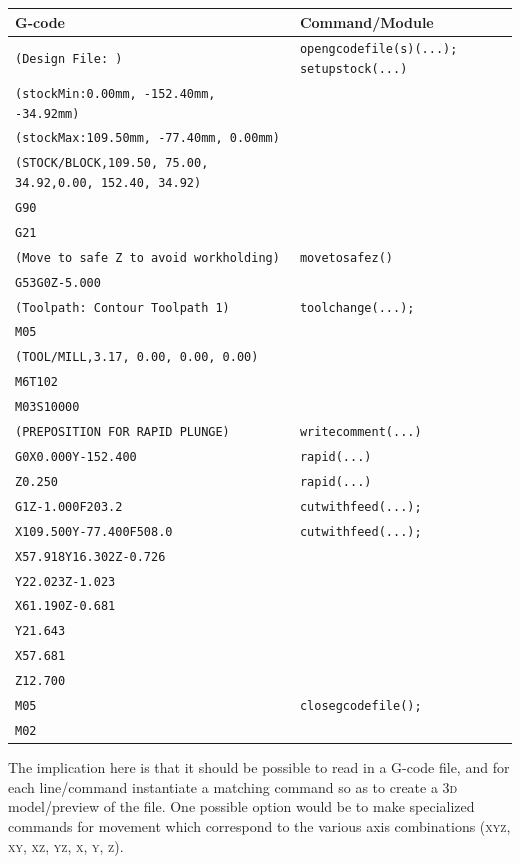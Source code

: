 \documentclass{ltxdoc}
\begin{document}
\noindent \begin{tabular}{@{}ll@{}} \toprule
 G-code                                                           & Command/Module \\ \midrule
 \verb|(Design File: )| &  \texttt{opengcodefile(s)(...);}
                           \texttt{setupstock(...)}\\
 \verb|(stockMin:0.00mm, -152.40mm, -34.92mm)| \\
 \verb|(stockMax:109.50mm, -77.40mm, 0.00mm)| \\
 \verb|(STOCK/BLOCK,109.50, 75.00, 34.92,0.00, 152.40, 34.92)| \\
 \verb|G90| \\
 \verb|G21| \\ \midrule
 \verb|(Move to safe Z to avoid workholding)| &  \texttt{movetosafez()} \\
 \verb|G53G0Z-5.000| \\ \midrule
 \verb|(Toolpath: Contour Toolpath 1)| &  \texttt{toolchange(...);}\\
 \verb|M05| \\
 \verb|(TOOL/MILL,3.17, 0.00, 0.00, 0.00)| \\
 \verb|M6T102| \\
 \verb|M03S10000|  \\ \midrule
 \verb|(PREPOSITION FOR RAPID PLUNGE)| & \texttt{writecomment(...)}\\ \midrule
 \verb|G0X0.000Y-152.400| & \texttt{rapid(...)}\\
 \verb|Z0.250| & \texttt{rapid(...)}\\ \midrule
 \verb|G1Z-1.000F203.2| & \texttt{cutwithfeed(...);}\\  
 \verb|X109.500Y-77.400F508.0| & \texttt{cutwithfeed(...);} \\ 
 \verb|X57.918Y16.302Z-0.726|\\ 
 \verb|Y22.023Z-1.023|\\ 
 \verb|X61.190Z-0.681|\\ 
 \verb|Y21.643|\\ 
 \verb|X57.681|\\
 \verb|Z12.700|\\ \midrule
 \verb|M05| &  \texttt{closegcodefile();}\\
 \verb|M02|\\
 \bottomrule
 \end{tabular}
\bigskip

The implication here is that it should be possible to read in a G-code file, and for each line/\allowbreak command instantiate a matching command so as to create a \textsc{3d} model/preview  of the file. One possible option would be to make specialized commands for movement which correspond to the various axis combinations (\textsc{xyz}, \textsc{xy}, \textsc{xz}, \textsc{yz}, \textsc{x}, \textsc{y}, \textsc{z}).
\end{document}
